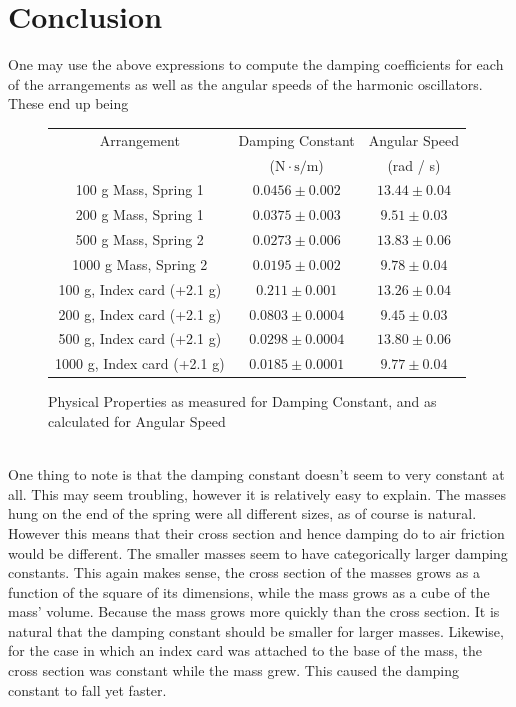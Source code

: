 \documentclass[11pt]{article}
\begin{document}
\section{Conclusion}
One may use the above expressions to compute the damping coefficients for each of the arrangements as well as the angular speeds of the harmonic oscillators. These end up being
\begin{figure}[h]
	\centering
	\caption{Physical Properties as measured for Damping Constant, and as calculated for Angular Speed}
\begin{tabular}{|c|c|c|}
	\hline 
	Arrangement & Damping Constant & Angular Speed  \\ 
	 & (\(\mathrm{N} \cdot \mathrm{s} / \mathrm{m} \)) & (rad / s) \\
	\hline 
	100 g Mass, Spring 1& \(0.0456 \pm 0.002 \)& \(13.44 \pm 0.04\) \\ 
	\hline 
	200 g Mass, Spring 1& \(0.0375 \pm 0.003 \)& \(9.51 \pm 0.03\) \\ 
	\hline 
 	500 g Mass, Spring 2& \(0.0273 \pm 0.006 \)& \(13.83 \pm 0.06\) \\ 
	\hline 
    1000 g Mass, Spring 2& \(0.0195 \pm 0.002 \)& \(9.78 \pm 0.04\) \\ 
	\hline 
	100 g, Index card (+2.1 g)& \(0.211 \pm 0.001 \)& \(13.26 \pm 0.04\) \\ 
	\hline 
	200 g, Index card (+2.1 g)& \(0.0803 \pm 0.0004 \)& \(9.45 \pm 0.03\) \\ 
	\hline 
	500 g, Index card (+2.1 g)& \(0.0298 \pm 0.0004 \)& \(13.80 \pm 0.06\) \\ 
	\hline 
	1000 g, Index card (+2.1 g)& \(0.0185 \pm 0.0001 \)& \(9.77 \pm 0.04\) \\ 
	\hline 
\end{tabular}
\end{figure}
\\
One thing to note is that the damping constant doesn't seem to very constant at all. This may seem troubling, however it is relatively easy to explain. The masses hung on the end of the spring were all different sizes, as of course is natural. However this means that their cross section and hence damping do to air friction would be different. The smaller masses seem to have categorically larger damping constants. This again makes sense, the cross section of the masses grows as a function of the square of its dimensions, while the mass grows as a cube of the mass' volume. Because the mass grows more quickly than the cross section. It is natural that the damping constant should be smaller for larger masses. Likewise, for the case in which an index card was attached to the base of the mass, the cross section was constant while the mass grew. This caused the damping constant to fall yet faster. 
\end{document}
